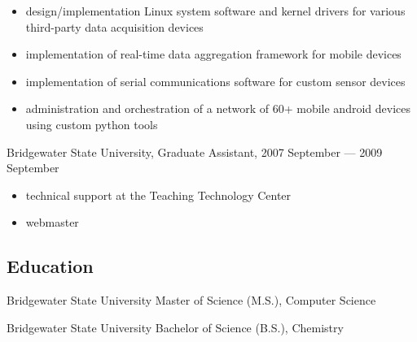 \documentclass[letterpaper,12pt]{article}
\begin{document}
\begin{itemize}
\item design/implementation Linux system software and kernel drivers for various
third-party data acquisition devices
\item implementation of real-time data aggregation framework for mobile devices
\item implementation of serial communications software for custom sensor devices
\item administration and orchestration of a network of 60+ mobile android devices using custom python tools
\end{itemize}

Bridgewater State University, Graduate Assistant, 2007 September --- 2009 September

\begin{itemize}
\item technical support at the Teaching Technology Center
\item webmaster
\end{itemize}

\subsection*{Education}

Bridgewater State University
Master of Science (M.S.), Computer Science

Bridgewater State University
Bachelor of Science (B.S.), Chemistry
\end{document}
